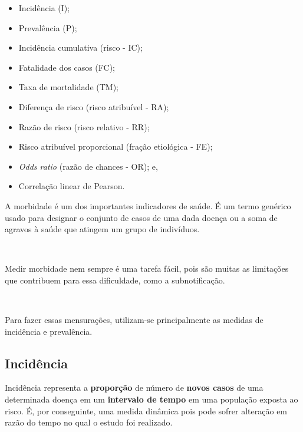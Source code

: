 \documentclass[
]{book}
\providecommand{\tightlist}{%
  \setlength{\itemsep}{0pt}\setlength{\parskip}{0pt}}
\begin{document}
\begin{itemize}
\tightlist
\item
  Incidência (I);\\
\item
  Prevalência (P);\\
\item
  Incidência cumulativa (risco - IC);\\
\item
  Fatalidade dos casos (FC);\\
\item
  Taxa de mortalidade (TM);\\
\item
  Diferença de risco (risco atribuível - RA);\\
\item
  Razão de risco (risco relativo - RR);\\
\item
  Risco atribuível proporcional (fração etiológica - FE);\\
\item
  \emph{Odds ratio} (razão de chances - OR); e,\\
\item
  Correlação linear de Pearson.
\end{itemize}

\hfill\break

A morbidade é um dos importantes indicadores de saúde. É um termo genérico usado para designar o conjunto de casos de uma dada doença ou a soma de agravos à saúde que atingem um grupo de indivíduos.

~

Medir morbidade nem sempre é uma tarefa fácil, pois são muitas as limitações que contribuem para essa dificuldade, como a subnotificação.

~

Para fazer essas mensurações, utilizam-se principalmente as medidas de incidência e prevalência.\\

\hypertarget{inciduxeancia}{%
\subsection{Incidência}\label{inciduxeancia}}

\hfill\break

Incidência representa a \textbf{proporção} de número de \textbf{novos casos} de uma determinada doença em um \textbf{intervalo de tempo} em uma população exposta ao risco. É, por conseguinte, uma medida dinâmica pois pode sofrer alteração em razão do tempo no qual o estudo foi realizado.
\end{document}

